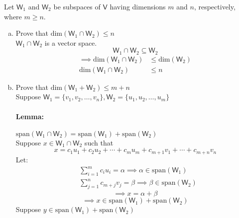Let $\mathsf{W}_1$ and $\mathsf{W}_2$ be subspaces of $\mathsf{V}$
having dimensions $m$ and $n$, respectively, where $m\geq n$.
\begin{enumerate}[(a)]
\item Prove that $\text{dim}(\mathsf{W}_1\cap\mathsf{W}_2) \leq n$
\\$\mathsf{W}_1\cap\mathsf{W}_2$ is a vector space.
\begin{equation}
\mathsf{W}_1\cap\mathsf{W}_2 \subseteq \mathsf{W}_2
\end{equation}
\begin{align}
\implies \text{dim}(\mathsf{W}_1\cap\mathsf{W}_2) &\leq
\text{dim}(\mathsf{W}_2) \\
\text{dim}(\mathsf{W}_1\cap\mathsf{W}_2) &\leq n
\end{align}
\item Prove that $\text{dim}(\mathsf{W}_1 +\mathsf{W}_2) \leq m+n$
\\Suppose $\mathsf{W}_1 =\{v_1,v_2,\dots,v_n\},
\mathsf{W}_2=\{u_1,u_2,\dots,u_m\}$
\paragraph{Lemma:} $\text{span}(\mathsf{W}_1\cap\mathsf{W}_2) =
\text{span}(\mathsf{W}_1) +\text{span}(\mathsf{W}_2)$
\\Suppose $x \in \mathsf{W}_1\cap\mathsf{W}_2$ such that
\begin{equation}
x=c_1u_1
+c_2u_2 +\cdots +c_mu_m+c_{m+1}v_1+ \cdots + c_{m+n}v_n
\end{equation}
Let:
\begin{align}
&\sum\limits_{i=1}^mc_iu_i=\alpha \implies \alpha \in
\text{span}(\mathsf{W}_1) \\
&\sum\limits_{j=1}^nc_{m+j}v_j=\beta \implies \beta \in
\text{span}(\mathsf{W}_2)
\end{align}
\begin{equation}
\implies x = \alpha + \beta
\end{equation}
\begin{equation}
\implies x \in \text{span}(\mathsf{W}_1) + \text{span}(\mathsf{W}_2)
\end{equation}
Suppose $y \in \text{span}(\mathsf{W}_1) + \text{span}(\mathsf{W}_2)$
\end{enumerate}
